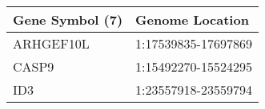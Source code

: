 \begin{tabular}{ll}
\toprule
Gene Symbol (7) &     Genome Location \\
\midrule
      ARHGEF10L & 1:17539835-17697869 \\
          CASP9 & 1:15492270-15524295 \\
            ID3 & 1:23557918-23559794 \\
\bottomrule
\end{tabular}
